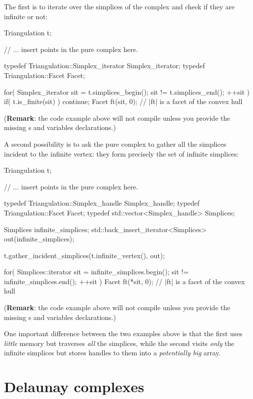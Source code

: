 {{The first is to iterate over the simplices of the complex and check if they
are infinite or not:

\begin{ccExampleCode}
Triangulation t;

// ... insert points in the pure complex here.

typedef Triangulation::Simplex_iterator Simplex_iterator;
typedef Triangulation::Facet Facet;

for( Simplex_iterator sit = t.simplices_begin(); sit != t.simplices_end(); ++sit )
{
    if( t.is_finite(sit) )
        continue;
    Facet ft(sit, 0); // |ft| is a facet of the convex hull
}
\end{ccExampleCode}
(\textbf{Remark}: the code example above will not compile unless you provide
the missing s and variables declarations.)

A second possibility is to ask the pure complex to gather all the simplices
incident to the infinite vertex: they form precisely the set of infinite
simplices:

\begin{ccExampleCode}
Triangulation t;

// ... insert points in the pure complex here.

typedef Triangulation::Simplex_handle Simplex_handle;
typedef Triangulation::Facet Facet;
typedef std::vector<Simplex_handle> Simplices;

Simplices infinite_simplices;
std::back_insert_iterator<Simplices> out(infinite_simplices);

t.gather_incident_simplices(t.infinite_vertex(), out);

for( Simplices::iterator sit = infinite_simplices.begin(); sit != infinite_simplices.end(); ++sit )
{
    Facet ft(*sit, 0); // |ft| is a facet of the convex hull
}
\end{ccExampleCode}
(\textbf{Remark}: the code example above will not compile unless you provide
the missing s and variables declarations.)

One important difference between the two examples above is that the first uses
\emph{little} memory but traverses \emph{all} the simplices, while the second
visits \emph{only} the infinite simplices but stores handles to them into a
\emph{potentially big} array.


\section{Delaunay complexes}%

}}
